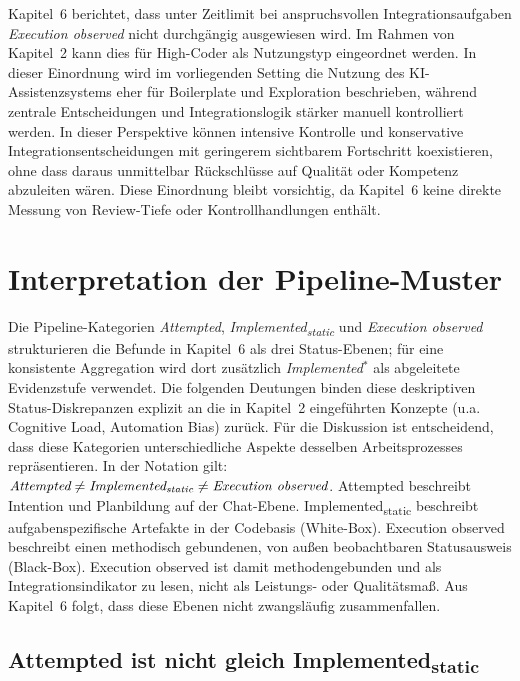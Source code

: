 Kapitel~6 berichtet, dass unter Zeitlimit bei anspruchsvollen Integrationsaufgaben \textit{Execution observed} nicht durchg\"angig ausgewiesen wird.
Im Rahmen von Kapitel~2 kann dies f\"ur High-Coder als Nutzungstyp eingeordnet werden.
In dieser Einordnung wird im vorliegenden Setting die Nutzung des KI-Assistenzsystems eher f\"ur Boilerplate und Exploration beschrieben, w\"ahrend zentrale Entscheidungen und Integrationslogik st\"arker manuell kontrolliert werden.
In dieser Perspektive k\"onnen intensive Kontrolle und konservative Integrationsentscheidungen mit geringerem sichtbarem Fortschritt koexistieren, ohne dass daraus unmittelbar R\"uckschl\"usse auf Qualit\"at oder Kompetenz abzuleiten w\"aren.
Diese Einordnung bleibt vorsichtig, da Kapitel~6 keine direkte Messung von Review-Tiefe oder Kontrollhandlungen enth\"alt.

\section{Interpretation der Pipeline-Muster}
\label{sec:discussion_pipeline}

Die Pipeline-Kategorien \textit{Attempted}, \textit{Implemented\textsubscript{static}} und \textit{Execution observed} strukturieren die Befunde in Kapitel~6 als drei Status-Ebenen; f\"ur eine konsistente Aggregation wird dort zus\"atzlich \textit{Implemented$^\ast$} als abgeleitete Evidenzstufe verwendet.
Die folgenden Deutungen binden diese deskriptiven Status-Diskrepanzen explizit an die in Kapitel~2 eingef\"uhrten Konzepte (u.a. Cognitive Load, Automation Bias) zur\"uck.
F\"ur die Diskussion ist entscheidend, dass diese Kategorien unterschiedliche Aspekte desselben Arbeitsprozesses repr\"asentieren.
In der Notation gilt: $\textit{Attempted} \neq \textit{Implemented\textsubscript{static}} \neq \textit{Execution observed}$.
Attempted beschreibt Intention und Planbildung auf der Chat-Ebene.
Implemented\textsubscript{static} beschreibt aufgabenspezifische Artefakte in der Codebasis (White-Box).
Execution observed beschreibt einen methodisch gebundenen, von au\ss en beobachtbaren Statusausweis (Black-Box).
Execution observed ist damit methodengebunden und als Integrationsindikator zu lesen, nicht als Leistungs- oder Qualit\"atsma\ss .
Aus Kapitel~6 folgt, dass diese Ebenen nicht zwangsl\"aufig zusammenfallen.

\subsection{Attempted ist nicht gleich \texorpdfstring{Implemented\textsubscript{static}}{Implementedstatic}}
\label{sec:discussion_attempted_vs_implemented}

